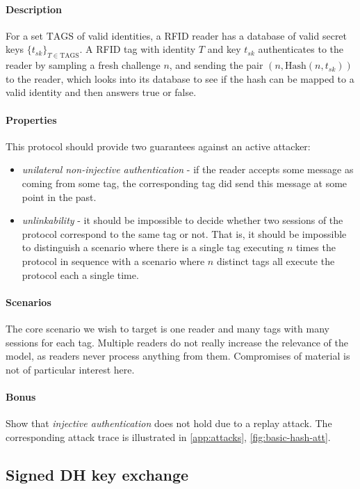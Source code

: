 \documentclass[11pt]{article}
\newcommand{\sfsk}{\mathit{sk}}
\newcommand{\kwf}[1]{\mathrm{#1}}
\newcommand{\hash}{\kwf{Hash}}
\newcommand{\tagset}{\kwf{TAGS}}
\begin{document}
\paragraph{Description} For a set $\tagset$ of valid identities, a RFID reader has a database of valid secret keys $\{t_\sfsk\}_{T \in \tagset}$. A RFID tag with identity $T$ and key $t_\sfsk$ authenticates to the reader by sampling a fresh challenge $n$, and sending the pair $(n,\hash(n,t_\sfsk))$ to the reader, which looks into its database to see if the hash can be mapped to a valid identity and then answers true or false.


\paragraph{Properties} This protocol should provide two guarantees against an active attacker:
\begin{itemize}
\item \emph{unilateral non-injective authentication} - if the reader accepts some message as coming from some tag, the corresponding tag did send this message at some point in the past.
\item \emph{unlinkability} - it should be impossible to decide whether two sessions of the protocol correspond to the same tag or not. That is, it should be impossible to distinguish a scenario where there is a single tag executing $n$ times the protocol in sequence with a scenario where $n$ distinct tags all execute the protocol each a single time. 
\end{itemize}

\paragraph{Scenarios} The core scenario we wish to target is one reader and many tags with many sessions for each tag. Multiple readers do not really increase the relevance of the model, as readers never process anything from them. Compromises of material is not of particular interest here.

\paragraph{Bonus} Show that \emph{injective authentication} does not hold due to a replay attack. The corresponding attack trace is illustrated in \cref{app:attacks}, \cref{fig:basic-hash-att}.

\subsection{Signed DH key exchange}\label{prob:dh}
\end{document}
